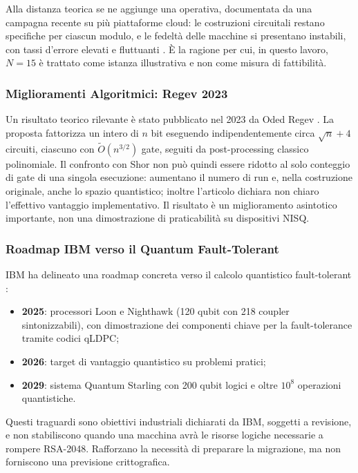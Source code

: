 Alla distanza teorica se ne aggiunge una operativa, documentata da una campagna recente su più piattaforme cloud: le costruzioni circuitali restano specifiche per ciascun modulo, e le fedeltà delle macchine si presentano instabili, con tassi d'errore elevati e fluttuanti \cite{shor_challenges2025}. È la ragione per cui, in questo lavoro, $N=15$ è trattato come istanza illustrativa e non come misura di fattibilità.

\subsubsection{Miglioramenti Algoritmici: Regev 2023}

Un risultato teorico rilevante è stato pubblicato nel 2023 da Oded Regev \cite{regev2023}. La proposta fattorizza un intero di $n$ bit eseguendo indipendentemente circa $\sqrt n+4$ circuiti, ciascuno con $\widetilde O(n^{3/2})$ gate, seguiti da post-processing classico polinomiale. Il confronto con Shor non può quindi essere ridotto al solo conteggio di gate di una singola esecuzione: aumentano il numero di run e, nella costruzione originale, anche lo spazio quantistico; inoltre l'articolo dichiara non chiaro l'effettivo vantaggio implementativo. Il risultato è un miglioramento asintotico importante, non una dimostrazione di praticabilità su dispositivi NISQ.

\subsubsection{Roadmap IBM verso il Quantum Fault-Tolerant}

\ac{IBM} ha delineato una roadmap concreta verso il calcolo quantistico fault-tolerant \cite{ibm_roadmap2025}:
\begin{itemize}
    \item \textbf{2025}: processori Loon e Nighthawk (120 qubit con 218 coupler sintonizzabili), con dimostrazione dei componenti chiave per la fault-tolerance tramite codici qLDPC;
    \item \textbf{2026}: target di vantaggio quantistico su problemi pratici;
    \item \textbf{2029}: sistema Quantum Starling con 200 qubit logici e oltre $10^8$ operazioni quantistiche.
\end{itemize}

Questi traguardi sono obiettivi industriali dichiarati da IBM, soggetti a revisione, e non stabiliscono quando una macchina avrà le risorse logiche necessarie a rompere RSA-2048. Rafforzano la necessità di preparare la migrazione, ma non forniscono una previsione crittografica.

